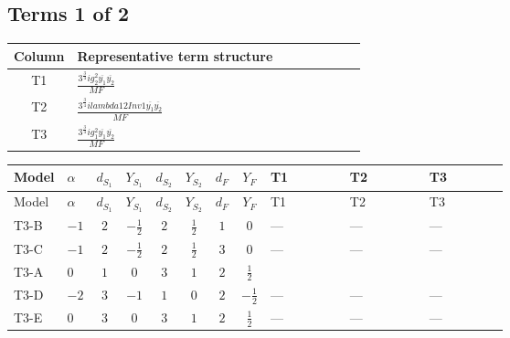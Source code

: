 \documentclass[8pt]{article}
\begin{document}
\begin{landscape}
\subsection*{Terms 1 of 2}
\begin{center}
\begin{tabular}{@{}c >{\raggedright\arraybackslash}p{0.82\linewidth}@{}}
\toprule
Column & Representative term structure \\
\midrule
T1 & \(\displaystyle \frac{3^{\frac{3}{4}} i g_{2}^{2} \overline{y_{1}} \overline{y_{2}}}{MF}\) \\
\midrule
T2 & \(\displaystyle \frac{3^{\frac{3}{4}} i lambda12Inv1 \overline{y_{1}} \overline{y_{2}}}{MF}\) \\
\midrule
T3 & \(\displaystyle \frac{3^{\frac{3}{4}} i g_{1}^{2} \overline{y_{1}} \overline{y_{2}}}{MF}\) \\
\midrule
\bottomrule
\end{tabular}
\end{center}
\smallskip
\tiny
\begin{longtable}{@{}llcccccc >{\raggedright\arraybackslash}p{0.21\linewidth} >{\raggedright\arraybackslash}p{0.21\linewidth} >{\raggedright\arraybackslash}p{0.21\linewidth}@{}}
\toprule
Model & $\alpha$ & $d_{S_1}$ & $Y_{S_1}$ & $d_{S_2}$ & $Y_{S_2}$ & $d_F$ & $Y_F$ & T1 & T2 & T3 \\
\midrule
\endfirsthead
\toprule
Model & $\alpha$ & $d_{S_1}$ & $Y_{S_1}$ & $d_{S_2}$ & $Y_{S_2}$ & $d_F$ & $Y_F$ & T1 & T2 & T3 \\
\midrule
\endhead
T3-B & $-1$ & $2$ & $-\frac{1}{2}$ & $2$ & $\frac{1}{2}$ & $1$ & $0$ & --- & --- & --- \\
\midrule
T3-C & $-1$ & $2$ & $-\frac{1}{2}$ & $2$ & $\frac{1}{2}$ & $3$ & $0$ & --- & --- & --- \\
\midrule
T3-A & $0$ & $1$ & $0$ & $3$ & $1$ & $2$ & $\frac{1}{2}$ & \scriptsize\adjustbox{max width=\linewidth}{$\begin{gathered} - \frac{11 \cdot 3^{\frac{3}{4}} i g_{2}^{2} \overline{y_{1}} \overline{y_{2}}}{8 MF}\end{gathered}$} & \scriptsize\adjustbox{max width=\linewidth}{$\begin{gathered} - \frac{3^{\frac{3}{4}} i lambda12Inv1 \overline{y_{1}} \overline{y_{2}}}{6 MF}\end{gathered}$} & \scriptsize\adjustbox{max width=\linewidth}{$\begin{gathered} - \frac{3^{\frac{3}{4}} i g_{1}^{2} \overline{y_{1}} \overline{y_{2}}}{8 MF}\end{gathered}$} \\
\midrule
T3-D & $-2$ & $3$ & $-1$ & $1$ & $0$ & $2$ & $-\frac{1}{2}$ & --- & --- & --- \\
\midrule
T3-E & $0$ & $3$ & $0$ & $3$ & $1$ & $2$ & $\frac{1}{2}$ & --- & --- & --- \\
\midrule
\bottomrule
\end{longtable}
\clearpage

\end{landscape}
\end{document}
